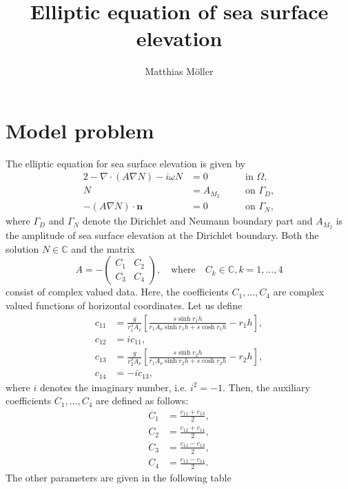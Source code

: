 \documentclass[11pt,a4paper]{article}
\title{Elliptic equation of sea surface elevation}
\author{Matthias M\"oller}
\begin{document}
\maketitle

\section*{Model problem}
The elliptic equation for sea surface elevation is given by
\begin{alignat}{2}
-\nabla\cdot(A\nabla N)-i\omega N&=0  \quad && \text{in } \Omega,
\label{eq:sse_scalar1}\\
N&=A_{M_2} \quad && \text{on } \Gamma_D,
\label{eq:sse_scalar2}\\
-(A\nabla N)\cdot\mathbf{n}&=0 \quad && \text{on } \Gamma_N,
\label{eq:sse_scatar3}
\end{alignat}
where $\Gamma_D$ and $\Gamma_N$ denote the Dirichlet and Neumann boundary part and $A_{M_2}$ is the amplitude of sea surface elevation at the Dirichlet boundary. Both the solution $N\in\mathbb{C}$ and the matrix
$$
A=-
\begin{pmatrix}
C_1 & C_2\\
C_3 & C_4
\end{pmatrix},\quad\text{where}\quad C_k\in\mathbb{C}, k=1,\dots,4
$$
consist of complex valued data. Here, the coefficients $C_1,\dots,C_4$ are complex valued functions of horizontal coordinates. Let us define
\begin{align*}
c_{11}&=\frac{g}{r_1^3A_\nu}\left[\frac{s \sinh r_1 h}{r_1 A_\nu \sinh r_1 h + s \cosh r_1 h}-r_1 h\right],\\
c_{12}&=ic_{11},\\
c_{13}&=\frac{g}{r_2^3A_\nu}\left[\frac{s \sinh r_2 h}{r_1 A_\nu \sinh r_2 h + s \cosh r_2 h}-r_2 h\right],\\
c_{14}&=-ic_{13},
\end{align*}
where $i$ denotes the imaginary number, i.e. $i^2=-1$. Then, the auxiliary coefficients $C_1,\dots,C_4$ are defined as follows:
\begin{align}
C_1&=\frac{c_{11}+c_{13}}{2},\\
C_2&=\frac{c_{12}+c_{14}}{2},\\
C_3&=\frac{c_{11}-c_{13}}{2},\\
C_4&=\frac{c_{12}-c_{14}}{2}.
\end{align}
The other parameters are given in the following table
\end{document}
